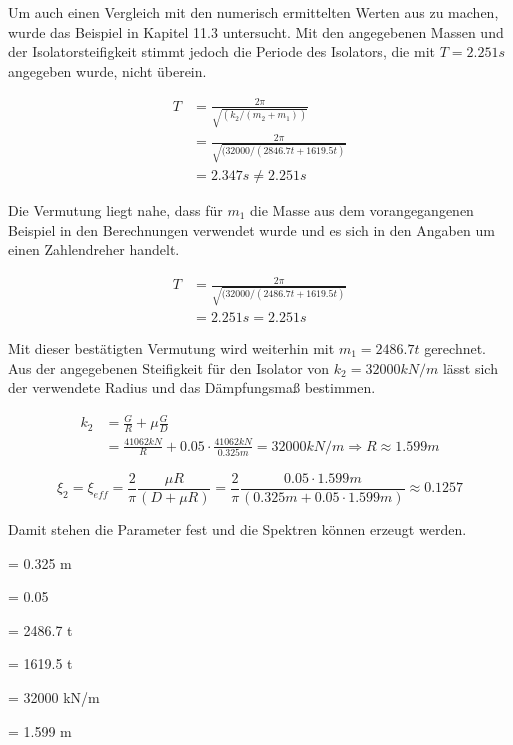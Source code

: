 Um auch einen Vergleich mit den numerisch ermittelten Werten aus \cite{Isemann} zu machen, wurde das Beispiel in Kapitel 11.3 untersucht.
Mit den angegebenen Massen und der Isolatorsteifigkeit stimmt jedoch die Periode des Isolators, die mit $T = 2.251 s$ angegeben wurde, nicht überein.

\begin{align*}
T &= \frac{2 \pi}{\sqrt{(k_2/(m_2+m_1))}}\\
  &= \frac{2 \pi}{\sqrt{(32000/( 2846.7 t + 1619.5 t)}}\\
  &= 2.347 s \neq 2.251 s
\end{align*}

Die Vermutung liegt nahe, dass für $m_1$ die Masse aus dem vorangegangenen Beispiel in den Berechnungen verwendet wurde und es sich in den Angaben um einen \glqq Zahlendreher\grqq{} handelt.

\begin{align*}
T &= \frac{2 \pi}{\sqrt{(32000/( 2486.7 t + 1619.5 t)}}\\
  &= 2.251 s = 2.251 s
\end{align*}

Mit dieser bestätigten Vermutung wird weiterhin mit $m_1 = 2486.7 t$ gerechnet.
Aus der angegebenen Steifigkeit für den Isolator von $k_2 = 32000 kN/m$ lässt sich der verwendete Radius und das Dämpfungsmaß bestimmen.

\begin{align*}
k_2 &= \frac{G}{R} + \mu \frac{G}{D}\\
    &= \frac{41062 kN}{R} + 0.05 \cdot \frac{41062 kN}{0.325 m} = 32000 kN/m \Rightarrow R \approx 1.599 m
\end{align*}

\begin{equation*}
\xi_2 = \xi_{eff} = \frac{2}{\pi} \frac{\mu R}{(D + \mu R)} = \frac{2}{\pi} \frac{0.05 \cdot 1.599 m}{(0.325 m + 0.05 \cdot 1.599 m)} \approx 0.1257
\end{equation*} 

\pagebreak

Damit stehen die Parameter fest und die Spektren können erzeugt werden.

    = 0.325 m \par
\makebox[1cm]{$\mu$}  = 0.05\par
{}  = 2486.7 t\par
{}  = 1619.5 t\par
{}  = 32000 kN/m \par
{}    = 1.599 m\par

